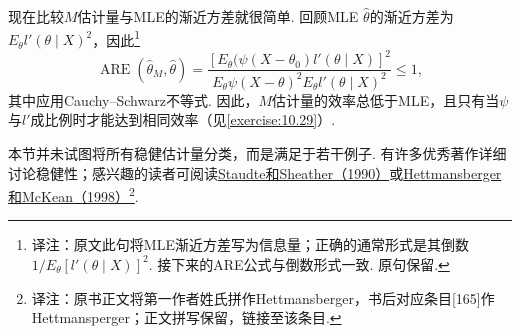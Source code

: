 现在比较$M$估计量与MLE的渐近方差就很简单. 回顾MLE $\hat\theta$的渐近方差为$E_\theta l'(\theta\mid X)^2$，因此\footnote{译注：原文此句将MLE渐近方差写为信息量；正确的通常形式是其倒数$1/E_\theta[l'(\theta\mid X)]^2$. 接下来的ARE公式与倒数形式一致. 原句保留.}
\begin{equation}\label{eq:10.2.9}
\operatorname{ARE}(\hat\theta_M,\hat\theta)=\frac{[E_\theta(\psi(X-\theta_0)l'(\theta\mid X)]^2}{E_\theta\psi(X-\theta)^2E_\theta l'(\theta\mid X)^2}\leq1,
\end{equation}
其中应用Cauchy--Schwarz不等式. 因此，$M$估计量的效率总低于MLE，且只有当$\psi$与$l'$成比例时才能达到相同效率（见\autoref{exercise:10.29}）.

本节并未试图将所有稳健估计量分类，而是满足于若干例子. 有许多优秀著作详细讨论稳健性；感兴趣的读者可阅读\hyperref[bib:source299]{Staudte和Sheather（1990）}或\hyperref[bib:source165]{Hettmansberger和McKean（1998）}\footnote{译注：原书正文将第一作者姓氏拼作Hettmansberger，书后对应条目[165]作Hettmansperger；正文拼写保留，链接至该条目.}.
